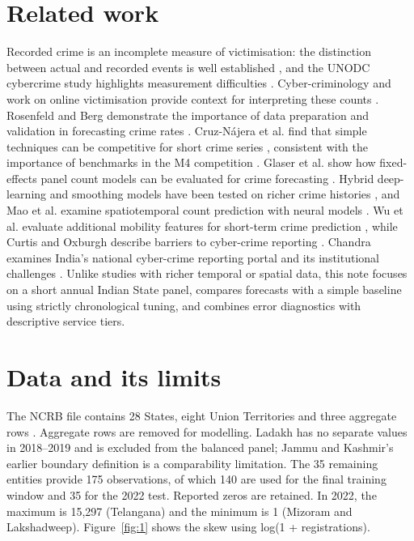 \documentclass[runningheads]{llncs}
\begin{document}
\section{Related work}
Recorded crime is an incomplete measure of victimisation: the distinction between actual and recorded events is well established \cite{ref3,ref4}, and the UNODC cybercrime study highlights measurement difficulties \cite{ref5}. Cyber-criminology and work on online victimisation provide context for interpreting these counts \cite{ref6,ref7}. Rosenfeld and Berg demonstrate the importance of data preparation and validation in forecasting crime rates \cite{ref8}. Cruz-Nájera et al. find that simple techniques can be competitive for short crime series \cite{ref9}, consistent with the importance of benchmarks in the M4 competition \cite{ref10}. Glaser et al. show how fixed-effects panel count models can be evaluated for crime forecasting \cite{ref11}. Hybrid deep-learning and smoothing models have been tested on richer crime histories \cite{ref12}, and Mao et al. examine spatiotemporal count prediction with neural models \cite{ref13}. Wu et al. evaluate additional mobility features for short-term crime prediction \cite{ref14}, while Curtis and Oxburgh describe barriers to cyber-crime reporting \cite{ref15}. Chandra examines India's national cyber-crime reporting portal and its institutional challenges \cite{ref16}. Unlike studies with richer temporal or spatial data, this note focuses on a short annual Indian State panel, compares forecasts with a simple baseline using strictly chronological tuning, and combines error diagnostics with descriptive service tiers.

\FloatBarrier
\section{Data and its limits}
The NCRB file contains 28 States, eight Union Territories and three aggregate rows \cite{ref1,ref2}. Aggregate rows are removed for modelling. Ladakh has no separate values in 2018--2019 and is excluded from the balanced panel; Jammu and Kashmir's earlier boundary definition is a comparability limitation. The 35 remaining entities provide 175 observations, of which 140 are used for the final training window and 35 for the 2022 test. Reported zeros are retained. In 2022, the maximum is 15,297 (Telangana) and the minimum is 1 (Mizoram and Lakshadweep). Figure~\ref{fig:1} shows the skew using log(1 + registrations).
\end{document}

